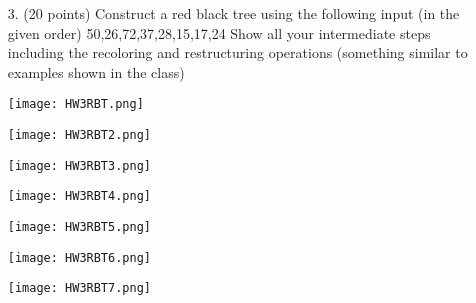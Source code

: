 \documentclass{article}
\begin{document}
\begin{enumerate}
\begin{enumerate}
        \end{enumerate}

        \item[3.] (20 points) Construct a red black tree using the following input (in
        the given order) 50,26,72,37,28,15,17,24
        Show all your intermediate steps including the recoloring and 
        restructuring operations (something similar to examples shown in the class)
    
        \begin{center}
            \texttt{[image: HW3RBT.png]}
        \end{center}
        \begin{center}
            \texttt{[image: HW3RBT2.png]}
        \end{center}
        \begin{center}
            \texttt{[image: HW3RBT3.png]}
        \end{center}
        \begin{center}
            \texttt{[image: HW3RBT4.png]}
        \end{center}
        \begin{center}
            \texttt{[image: HW3RBT5.png]}
        \end{center}
        \begin{center}
            \texttt{[image: HW3RBT6.png]}
        \end{center}
        \begin{center}
            \texttt{[image: HW3RBT7.png]}
        \end{center}
        
        
    \end{enumerate}
\end{document}
